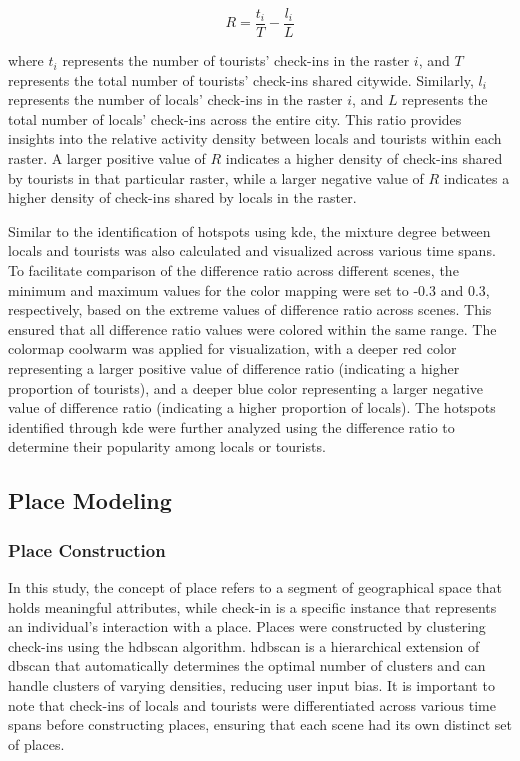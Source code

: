 \documentclass{article}
\theoremstyle{definition}
\theoremstyle{remark}
\begin{document}
\begin{equation} \label{eq:diff_ratio}
    R = \frac{t_{i}}{T}-\frac{l_{i}}{L}
\end{equation}

where $t_{i}$ represents the number of tourists' check-ins in the raster $i$, and $T$ represents the total number of tourists' check-ins shared citywide. Similarly, $l_{i}$ represents the number of locals' check-ins in the raster $i$, and $L$ represents the total number of locals' check-ins across the entire city. This ratio provides insights into the relative activity density between locals and tourists within each raster. A larger positive value of $R$ indicates a higher density of check-ins shared by tourists in that particular raster, while a larger negative value of \(R\) indicates a higher density of check-ins shared by locals in the raster.

Similar to the identification of hotspots using \acrshort{kde}, the mixture degree between locals and tourists was also calculated and visualized across various time spans. To facilitate comparison of the difference ratio across different scenes, the minimum and maximum values for the color mapping were set to -0.3 and 0.3, respectively, based on the extreme values of difference ratio across scenes. This ensured that all difference ratio values were colored within the same range. The colormap coolwarm was applied for visualization, with a deeper red color representing a larger positive value of difference ratio (indicating a higher proportion of tourists), and a deeper blue color representing a larger negative value of difference ratio (indicating a higher proportion of locals). The hotspots identified through \acrshort{kde} were further analyzed using the difference ratio to determine their popularity among locals or tourists.


\subsection{Place Modeling} \label{place_modeling}

\subsubsection{Place Construction} \label{place_construction}
In this study, the concept of place refers to a segment of geographical space that holds meaningful attributes, while check-in is a specific instance that represents an individual's interaction with a place. Places were constructed by clustering check-ins using the \acrfull{hdbscan} \citep{campello_density-based_2013} algorithm. \acrshort{hdbscan} is a hierarchical extension of \acrshort{dbscan} that automatically determines the optimal number of clusters and can handle clusters of varying densities, reducing user input bias. It is important to note that check-ins of locals and tourists were differentiated across various time spans before constructing places, ensuring that each scene had its own distinct set of places.
\end{document}
